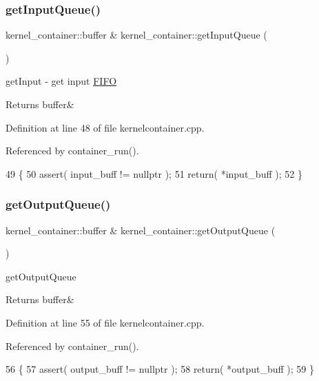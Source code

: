 \subsubsection{\texorpdfstring{get\+Input\+Queue()}{getInputQueue()}}
{\footnotesize\ttfamily kernel\+\_\+container\+::buffer \& kernel\+\_\+container\+::get\+Input\+Queue (\begin{DoxyParamCaption}{ }\end{DoxyParamCaption})}

get\+Input -\/ get input \hyperlink{class_f_i_f_o}{F\+I\+FO} \begin{DoxyReturn}{Returns}
buffer\& 
\end{DoxyReturn}


Definition at line 48 of file kernelcontainer.\+cpp.



Referenced by container\+\_\+run().


\begin{DoxyCode}
49 \{
50    assert( input\_buff != \textcolor{keyword}{nullptr} );
51    \textcolor{keywordflow}{return}( *input\_buff );
52 \}
\end{DoxyCode}
\hypertarget{classkernel__container_a64384e258fee9b664d164eb50baf33df}{}\label{classkernel__container_a64384e258fee9b664d164eb50baf33df} 
\subsubsection{\texorpdfstring{get\+Output\+Queue()}{getOutputQueue()}}
{\footnotesize\ttfamily kernel\+\_\+container\+::buffer \& kernel\+\_\+container\+::get\+Output\+Queue (\begin{DoxyParamCaption}{ }\end{DoxyParamCaption})}

get\+Output\+Queue \begin{DoxyReturn}{Returns}
buffer\& 
\end{DoxyReturn}


Definition at line 55 of file kernelcontainer.\+cpp.



Referenced by container\+\_\+run().


\begin{DoxyCode}
56 \{
57    assert( output\_buff != \textcolor{keyword}{nullptr} );
58    \textcolor{keywordflow}{return}( *output\_buff );
59 \}
\end{DoxyCode}
\hypertarget{classkernel__container_a358a15b772f1b7dfa57bd733fc78fcaa}{}\label{classkernel__container_a358a15b772f1b7dfa57bd733fc78fcaa} 
